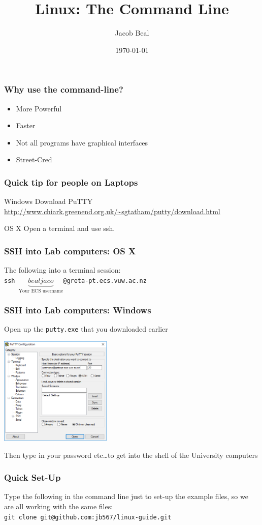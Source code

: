 \documentclass{beamer}
\title[Learning Linux]{Linux: The Command Line}
\author{Jacob Beal}
\date{\today}
\begin{document}
\frame{\titlepage}
\begin{frame}
    \frametitle{Why use the command-line?}
    \begin{itemize}
        \item<1-> More Powerful
        \item<2-> Faster
        \item<3-> Not all programs have graphical interfaces
        \item<4-> Street-Cred
    \end{itemize}
\end{frame}
\begin{frame}
    \frametitle{Quick tip for people on Laptops}
    \begin{block}{Windows}
    Download PuTTY \url{http://www.chiark.greenend.org.uk/~sgtatham/putty/download.html}
    \end{block}
    \pause{}
    \begin{block}{OS X}
    Open a terminal and use ssh.
    \end{block}
\end{frame}
\begin{frame}[fragile]
    \frametitle{SSH into Lab computers: OS X}
    The following into a terminal session:\\
    \verb|ssh |$\underbrace{bealjaco}_\text{Your ECS username}$\verb|@greta-pt.ecs.vuw.ac.nz|
\end{frame}
\begin{frame}[fragile]
    \frametitle{SSH into Lab computers: Windows}
    Open up the \verb|putty.exe| that you downloaded earlier
    \begin{center}
        \includegraphics[width=0.4\textwidth]{putty}
    \end{center}
    Then type in your password etc\ldots to get into the shell of the
    University computers
\end{frame}
\begin{frame}[fragile]
    \frametitle{Quick Set-Up}
    Type the following in the command line just to set-up the example files, so
    we are all working with the same files:\\
    \verb|git clone git@github.com:jb567/linux-guide.git|\\ %
\end{frame}
\end{document}
